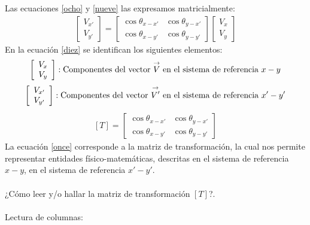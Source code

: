 \documentclass[12pt,letterpaper]{article}
\begin{document}
%
Las ecuaciones \ref{ocho} y \ref{nueve} las expresamos matricialmente:
%
\begin{eqnarray}
		\left[ \begin{array}{c} V_{x'} \\
		V_{y'} \end{array} \right] = 
		\left[ \begin{array}{cc}
		\cos \theta_{x-x'} & \cos \theta_{y-x'} \\  
		\cos \theta_{x-y'} & \cos \theta_{y-y'}
		\end{array}  \right] 
		\left[ \begin{array}{c} V_{x} \\
		V_{y} \end{array} \right]
		\label{diez}
\end{eqnarray}
%
En la ecuación \ref{diez} se identifican los siguientes elementos:
%
\begin{align*}
	\left[ \begin{array}{c}
		V_x \\
		V_y	
	\end{array} \right]: \textup{Componentes del vector $\overset{\rightarrow}{V}$ en el sistema de referencia $x-y$} 
\end{align*}
%
\begin{align*}
	\left[ \begin{array}{c}
		V_{x'} \\
		V_{y'}	
	\end{array} \right]: \textup{Componentes del vector $\overset{\rightarrow}{V'}$ en el sistema de referencia $x'-y'$} 
\end{align*}
%
\begin{align}
	\left[ T \right] = \left[ \begin{array}{cc}
		\cos \theta_{x-x'} & \cos \theta_{y-x'} \\
		\cos \theta_{x-y'} & \cos \theta_{y-y'}	
	\end{array} \right] \label{once}
\end{align}
%
La  ecuación \ref{once} corresponde a la matriz de transformación, la cual nos permite representar entidades físico-matemáticas, descritas en el sistema de referencia $x-y$, en el sistema de referencia $x'-y'$.\\\\
%
¿Cómo leer y/o hallar la matriz de transformación $\left[ T \right]$?.\\\\
%
Lectura de columnas:
%
\end{document}
